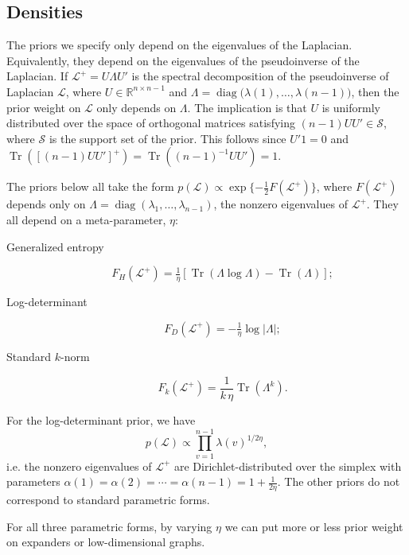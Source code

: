 \documentclass[12pt]{article}
\newcommand{\reals}{\mathbb{R}}
\DeclareMathOperator*{\Tr}{Tr}
\DeclareMathOperator*{\diag}{diag}
\theoremstyle{plain}
\begin{document}
\subsection{Densities}

The priors we specify only depend on the eigenvalues of the Laplacian.
Equivalently, they depend on the eigenvalues of the pseudoinverse of
the Laplacian.  If $\mathcal{L}^+ = U \Lambda U'$ is the spectral
decomposition of the pseudoinverse of Laplacian $\mathcal{L}$, where
$U \in \reals^{n \times n -1}$ and
$\Lambda = \diag\big(\lambda(1), \dotsc, \lambda({n-1})\big)$, then the prior
weight on $\mathcal{L}$ only depends on $\Lambda$.  The implication is
that $U$ is uniformly distributed over the space of orthogonal
matrices satisfying $(n-1) U U' \in \mathcal{S}$, where $\mathcal{S}$ is the
support set of the prior.  This follows since $U'1 = 0$ and $\Tr([(n-1) U U']^+) =
\Tr((n-1)^{-1} U U') = 1$.

The priors below all take the form $p(\mathcal{L}) \propto
\exp\{-\tfrac{1}{2} F(\mathcal{L}^{+})\}$, where $F(\mathcal{L}^{+})$
depends only on $\Lambda = \diag(\lambda_1, \dotsc, \lambda_{n-1})$, the nonzero
eigenvalues of $\mathcal{L}^{+}$.  They all depend on a
meta-parameter, $\eta$:

\begin{description}
  \item[Generalized entropy]
    \[
      F_H(\mathcal{L}^+) = \tfrac{1}{\eta}[ \Tr( \Lambda \log \Lambda)
      - \Tr(\Lambda)];
    \]
  \item[Log-determinant]
    \[
      F_D(\mathcal{L}^{+}) = - \tfrac{1}{\eta} \log |\Lambda|;
    \]
  \item[Standard $k$-norm]
    \[
      F_k(\mathcal{L}^+)
        = \frac{1}{k \, \eta} \Tr(\Lambda^k).
  \]
\end{description}
 
For the log-determinant prior, we have
\[
  p(\mathcal{L})
    \propto \prod_{v=1}^{n-1} \lambda(v)^{1/2 \eta},
\]
i.e. the nonzero eigenvalues of $\mathcal{L}^{+}$ are
Dirichlet-distributed over the simplex with parameters $\alpha(1) =
\alpha(2) = \dotsb = \alpha(n-1) = 1 + \tfrac{1}{2\eta}$.  The other
priors do not correspond to standard parametric forms.

For all three parametric forms, by varying $\eta$ we can put more or
less prior weight on expanders or low-dimensional graphs.
\end{document}
